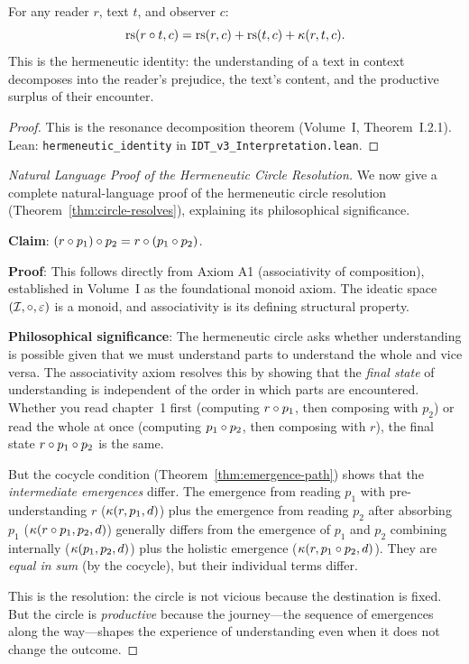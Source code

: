 \begin{theorem}
\label{thm:hermeneutic-identity}
For any reader $r$, text $t$, and observer $c$:
\[
\mathrm{rs}(r \circ t, c) = \mathrm{rs}(r, c) + \mathrm{rs}(t, c) + \kappa(r, t, c).
\]
This is the hermeneutic identity: the understanding of a text in context
decomposes into the reader's prejudice, the text's content, and the
productive surplus of their encounter.
\end{theorem}

\begin{proof}
This is the resonance decomposition theorem (Volume~I, Theorem~I.2.1).
Lean: \texttt{hermeneutic\_identity} in \texttt{IDT\_v3\_Interpretation.lean}.
\end{proof}

\begin{proof}[Natural Language Proof of the Hermeneutic Circle Resolution]
We now give a complete natural-language proof of the hermeneutic circle
resolution (Theorem~\ref{thm:circle-resolves}), explaining its philosophical
significance.

\textbf{Claim}: $(r \circ p_1) \circ p_2 = r \circ (p_1 \circ p_2)$.

\textbf{Proof}: This follows directly from Axiom A1 (associativity of
composition), established in Volume~I as the foundational monoid axiom.
The ideatic space $(\mathcal{I}, \circ, \varepsilon)$ is a monoid, and associativity
is its defining structural property.

\textbf{Philosophical significance}: The hermeneutic circle asks whether
understanding is possible given that we must understand parts to understand
the whole and vice versa. The associativity axiom resolves this by showing
that the \emph{final state} of understanding is independent of the order in
which parts are encountered. Whether you read chapter~1 first (computing
$r \circ p_1$, then composing with $p_2$) or read the whole at once
(computing $p_1 \circ p_2$, then composing with $r$), the final state
$r \circ p_1 \circ p_2$ is the same.

But the cocycle condition (Theorem~\ref{thm:emergence-path}) shows that the
\emph{intermediate emergences} differ. The emergence from reading $p_1$ with
pre-understanding $r$ ($\kappa(r, p_1, d)$) plus the emergence from reading
$p_2$ after absorbing $p_1$ ($\kappa(r \circ p_1, p_2, d)$) generally
differs from the emergence of $p_1$ and $p_2$ combining internally
($\kappa(p_1, p_2, d)$) plus the holistic emergence ($\kappa(r, p_1 \circ p_2, d)$).
They are \emph{equal in sum} (by the cocycle), but their individual terms
differ.

This is the resolution: the circle is not vicious because the destination is
fixed. But the circle is \emph{productive} because the journey---the sequence
of emergences along the way---shapes the experience of understanding even when
it does not change the outcome.
\end{proof}



